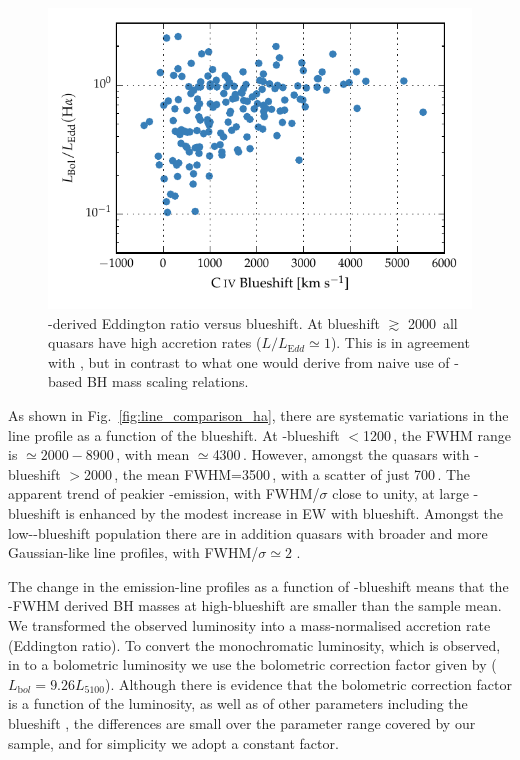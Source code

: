 \begin{figure}
    \centering
    \includegraphics[width=0.8\linewidth]{figures/chapter03/ha_edd_civ_bs.pdf}
    \caption[{\hans-derived Eddington ratio versus  blueshift.}]{\hans-derived Eddington ratio versus  blueshift. At blueshift $\gtrsim$ 2000\kms\, all quasars have high accretion rates ($L/L_{\mathrm Edd} \simeq 1$). This is in agreement with \citet{kratzer15}, but in contrast to what one would derive from naive use of -based BH mass scaling relations.}
    \label{fig:ha_edd_civ_bs}
\end{figure}

As shown in Fig.~\ref{fig:line_comparison_ha}, there are systematic variations in the \ha line profile as a function of the  blueshift. 
At -blueshift $<$1200\,\kms, the \ha FWHM range is $\simeq2000 - 8900$\,\kms, with mean $\simeq$4300\,\kms.
However, amongst the quasars with -blueshift $>$2000\,\kms, the mean \ha FWHM=3500\,\kms, with a scatter of just 700\,\kms. 
The apparent trend of peakier \hans-emission, with FWHM/$\sigma$ close to unity, at large -blueshift is enhanced by the modest increase in \ha EW with blueshift. 
Amongst the low--blueshift population there are in addition quasars with broader and more Gaussian-like \ha line profiles, with FWHM/$\sigma \simeq 2$ . 

The change in the \ha emission-line profiles as a function of -blueshift means that the \hans-FWHM derived BH masses at high-blueshift are smaller than the sample mean. 
We transformed the observed luminosity into a mass-normalised accretion rate (Eddington ratio).
To convert the monochromatic luminosity, which is observed, in to a bolometric luminosity we use the bolometric correction factor given by \citet{richards06} ($L_{\mathrm bol} = 9.26L_{5100}$).
Although there is evidence that the bolometric correction factor is a function of the luminosity, as well as of other parameters including the  blueshift \citep{krawczyk13}, the differences are small over the parameter range covered by our sample, and for simplicity we adopt a constant factor. 


